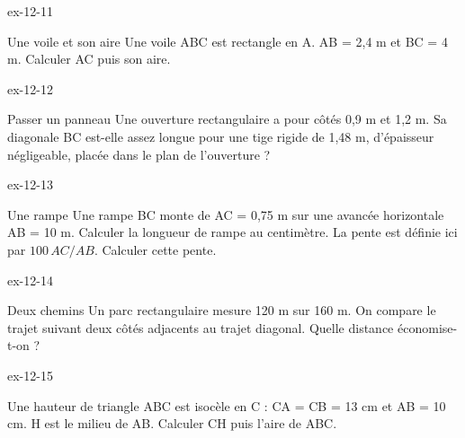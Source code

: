 \clearpage{}
\begin{blocLivre}{ex-12-11}\begin{exercice}[3]{Une voile et son aire}
Une voile ABC est rectangle en A. AB = 2,4 m et BC = 4 m. Calculer AC puis son aire.
\label{fig-ex-12-11}
\end{exercice}\end{blocLivre}
\begin{blocLivre}{ex-12-12}\begin{exercice}[3]{Passer un panneau}
Une ouverture rectangulaire a pour côtés 0,9 m et 1,2 m. Sa diagonale BC est-elle assez longue pour une tige rigide de 1,48 m, d’épaisseur négligeable, placée dans le plan de l’ouverture ?
\label{fig-ex-12-12}
\end{exercice}\end{blocLivre}
\begin{blocLivre}{ex-12-13}\begin{exercice}[3]{Une rampe}
Une rampe BC monte de AC = 0,75 m sur une avancée horizontale AB = 10 m. Calculer la longueur de rampe au centimètre. La pente est définie ici par $100\,AC/AB$. Calculer cette pente.
\label{fig-ex-12-13}
\end{exercice}\end{blocLivre}
\begin{blocLivre}{ex-12-14}\begin{exercice}[3]{Deux chemins}
Un parc rectangulaire mesure 120 m sur 160 m. On compare le trajet suivant deux côtés adjacents au trajet diagonal. Quelle distance économise-t-on ?
\label{fig-ex-12-14}
\end{exercice}\end{blocLivre}
\begin{blocLivre}{ex-12-15}\begin{exercice}[3]{Une hauteur de triangle}
ABC est isocèle en C : CA = CB = 13 cm et AB = 10 cm. H est le milieu de AB. Calculer CH puis l’aire de ABC.
\label{fig-ex-12-15}
\end{exercice}\end{blocLivre}

\clearpage
